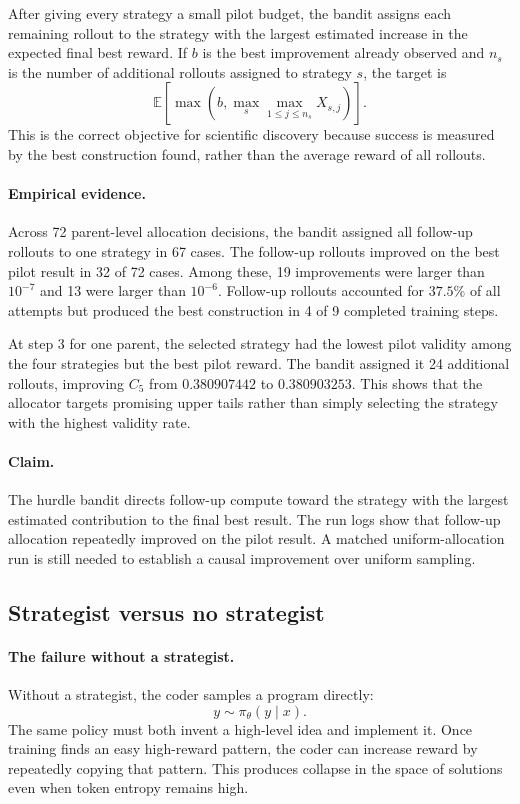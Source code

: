 After giving every strategy a small pilot budget, the bandit assigns each
remaining rollout to the strategy with the largest estimated increase in the
expected final best reward. If $b$ is the best improvement already observed
and $n_s$ is the number of additional rollouts assigned to strategy $s$, the
target is
\[
\mathbb{E}
\left[
\max\left(
b,
\max_s\max_{1\leq j\leq n_s}X_{s,j}
\right)
\right].
\]
This is the correct objective for scientific discovery because success is
measured by the best construction found, rather than the average reward of all
rollouts.

\paragraph{Empirical evidence.}
Across 72 parent-level allocation decisions, the bandit assigned all follow-up
rollouts to one strategy in 67 cases. The follow-up rollouts improved on the
best pilot result in 32 of 72 cases. Among these, 19 improvements were larger
than $10^{-7}$ and 13 were larger than $10^{-6}$. Follow-up rollouts accounted
for $37.5\%$ of all attempts but produced the best construction in 4 of 9
completed training steps.

At step 3 for one parent, the selected strategy had the lowest pilot validity
among the four strategies but the best pilot reward. The bandit assigned it 24
additional rollouts, improving $C_5$ from $0.380907442$ to $0.380903253$. This
shows that the allocator targets promising upper tails rather than simply
selecting the strategy with the highest validity rate.

\paragraph{Claim.}
The hurdle bandit directs follow-up compute toward the strategy with the
largest estimated contribution to the final best result. The run logs show
that follow-up allocation repeatedly improved on the pilot result. A matched
uniform-allocation run is still needed to establish a causal improvement over
uniform sampling.


\subsection*{Strategist versus no strategist}

\paragraph{The failure without a strategist.}
Without a strategist, the coder samples a program directly:
\[
y\sim\pi_\theta(y\mid x).
\]
The same policy must both invent a high-level idea and implement it. Once
training finds an easy high-reward pattern, the coder can increase reward by
repeatedly copying that pattern. This produces collapse in the space of
solutions even when token entropy remains high.

